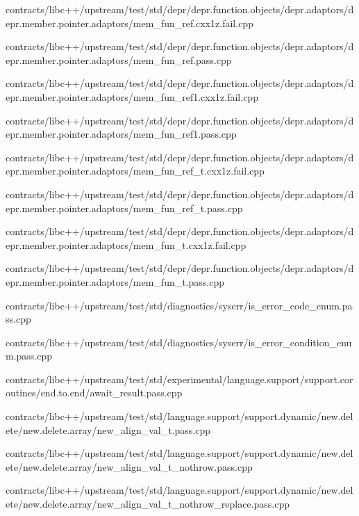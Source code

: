 \begin{DoxyCompactItemize}
contracts/libc++/upstream/test/std/depr/depr.\+function.\+objects/depr.\+adaptors/depr.\+member.\+pointer.\+adaptors/mem\+\_\+fun\+\_\+ref.\+cxx1z.\+fail.\+cpp\item 
contracts/libc++/upstream/test/std/depr/depr.\+function.\+objects/depr.\+adaptors/depr.\+member.\+pointer.\+adaptors/mem\+\_\+fun\+\_\+ref.\+pass.\+cpp\item 
contracts/libc++/upstream/test/std/depr/depr.\+function.\+objects/depr.\+adaptors/depr.\+member.\+pointer.\+adaptors/mem\+\_\+fun\+\_\+ref1.\+cxx1z.\+fail.\+cpp\item 
contracts/libc++/upstream/test/std/depr/depr.\+function.\+objects/depr.\+adaptors/depr.\+member.\+pointer.\+adaptors/mem\+\_\+fun\+\_\+ref1.\+pass.\+cpp\item 
contracts/libc++/upstream/test/std/depr/depr.\+function.\+objects/depr.\+adaptors/depr.\+member.\+pointer.\+adaptors/mem\+\_\+fun\+\_\+ref\+\_\+t.\+cxx1z.\+fail.\+cpp\item 
contracts/libc++/upstream/test/std/depr/depr.\+function.\+objects/depr.\+adaptors/depr.\+member.\+pointer.\+adaptors/mem\+\_\+fun\+\_\+ref\+\_\+t.\+pass.\+cpp\item 
contracts/libc++/upstream/test/std/depr/depr.\+function.\+objects/depr.\+adaptors/depr.\+member.\+pointer.\+adaptors/mem\+\_\+fun\+\_\+t.\+cxx1z.\+fail.\+cpp\item 
contracts/libc++/upstream/test/std/depr/depr.\+function.\+objects/depr.\+adaptors/depr.\+member.\+pointer.\+adaptors/mem\+\_\+fun\+\_\+t.\+pass.\+cpp\item 
contracts/libc++/upstream/test/std/diagnostics/syserr/is\+\_\+error\+\_\+code\+\_\+enum.\+pass.\+cpp\item 
contracts/libc++/upstream/test/std/diagnostics/syserr/is\+\_\+error\+\_\+condition\+\_\+enum.\+pass.\+cpp\item 
contracts/libc++/upstream/test/std/experimental/language.\+support/support.\+coroutines/end.\+to.\+end/await\+\_\+result.\+pass.\+cpp\item 
contracts/libc++/upstream/test/std/language.\+support/support.\+dynamic/new.\+delete/new.\+delete.\+array/new\+\_\+align\+\_\+val\+\_\+t.\+pass.\+cpp\item 
contracts/libc++/upstream/test/std/language.\+support/support.\+dynamic/new.\+delete/new.\+delete.\+array/new\+\_\+align\+\_\+val\+\_\+t\+\_\+nothrow.\+pass.\+cpp\item 
contracts/libc++/upstream/test/std/language.\+support/support.\+dynamic/new.\+delete/new.\+delete.\+array/new\+\_\+align\+\_\+val\+\_\+t\+\_\+nothrow\+\_\+replace.\+pass.\+cpp\item 

\end{DoxyCompactItemize}
